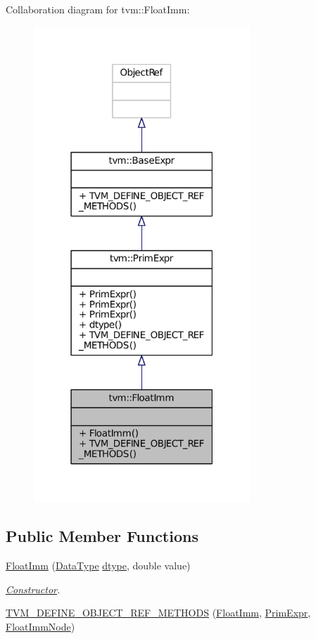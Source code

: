Collaboration diagram for tvm\+:\+:Float\+Imm\+:
\nopagebreak
\begin{figure}[H]
\begin{center}
\leavevmode
\includegraphics[width=230pt]{classtvm_1_1FloatImm__coll__graph}
\end{center}
\end{figure}
\subsection*{Public Member Functions}
\begin{DoxyCompactItemize}
\item 
\hyperlink{classtvm_1_1FloatImm_ab35cde2bd2821e70a8f025cb8116517e}{Float\+Imm} (\hyperlink{namespacetvm_a41918af1a1dc386388639a9d3ad06c5d}{Data\+Type} \hyperlink{classtvm_1_1PrimExpr_a1098008618699c33adfbd19e582f9ffd}{dtype}, double value)
\begin{DoxyCompactList}\small\item\em \hyperlink{classtvm_1_1Constructor}{Constructor}. \end{DoxyCompactList}\item 
\hyperlink{classtvm_1_1FloatImm_a7175c829584893f61239ff9605e4ab7b}{T\+V\+M\+\_\+\+D\+E\+F\+I\+N\+E\+\_\+\+O\+B\+J\+E\+C\+T\+\_\+\+R\+E\+F\+\_\+\+M\+E\+T\+H\+O\+DS} (\hyperlink{classtvm_1_1FloatImm}{Float\+Imm}, \hyperlink{classtvm_1_1PrimExpr}{Prim\+Expr}, \hyperlink{classtvm_1_1FloatImmNode}{Float\+Imm\+Node})
\end{DoxyCompactItemize}


